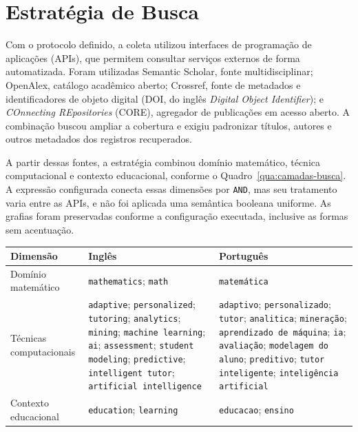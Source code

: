 \section{Estratégia de Busca}

Com o protocolo definido, a coleta utilizou interfaces de programação de aplicações (APIs), que permitem consultar serviços externos de forma automatizada. Foram utilizadas Semantic Scholar, fonte multidisciplinar; OpenAlex, catálogo acadêmico aberto; Crossref, fonte de metadados e identificadores de objeto digital (DOI, do inglês \textit{Digital Object Identifier}); e \textit{COnnecting REpositories} (CORE), agregador de publicações em acesso aberto. A combinação buscou ampliar a cobertura e exigiu padronizar títulos, autores e outros metadados dos registros recuperados.

A partir dessas fontes, a estratégia combinou domínio matemático, técnica computacional e contexto educacional, conforme o Quadro~\ref{qua:camadas-busca}. A expressão configurada conecta essas dimensões por \texttt{AND}, mas seu tratamento varia entre as APIs, e não foi aplicada uma semântica booleana uniforme. As grafias foram preservadas conforme a configuração executada, inclusive as formas sem acentuação.

\begin{quadro}[H]
\centering
\caption{Camadas da estratégia de busca bilíngue.}
\label{qua:camadas-busca}
\begin{tabularx}{\textwidth}{|>{\raggedright\arraybackslash}p{2.8cm}|>{\raggedright\arraybackslash}X|>{\raggedright\arraybackslash}X|}
\hline
\textbf{Dimensão} & \textbf{Inglês} & \textbf{Português} \\
\hline
Domínio matemático & \texttt{mathematics}; \texttt{math} & \texttt{matemática} \\
\hline
Técnicas computacionais & \texttt{adaptive}; \texttt{personalized}; \texttt{tutoring}; \texttt{analytics}; \texttt{mining}; \texttt{machine learning}; \texttt{ai}; \texttt{assessment}; \texttt{student modeling}; \texttt{predictive}; \texttt{intelligent tutor}; \texttt{artificial intelligence} & \texttt{adaptivo}; \texttt{personalizado}; \texttt{tutor}; \texttt{analitica}; \texttt{mineração}; \texttt{aprendizado de máquina}; \texttt{ia}; \texttt{avaliação}; \texttt{modelagem do aluno}; \texttt{preditivo}; \texttt{tutor inteligente}; \texttt{inteligência artificial} \\
\hline
Contexto educacional & \texttt{education}; \texttt{learning} & \texttt{educacao}; \texttt{ensino} \\
\hline
\end{tabularx}
\end{quadro}

